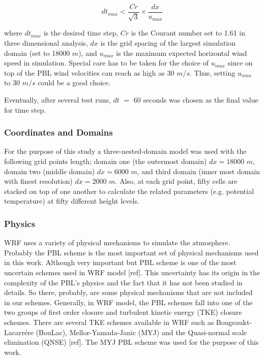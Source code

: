 \documentclass[a4paper,12pt]{article}
\numberwithin{equation}{section} %
\begin{document}
\vspace{0.25cm}
\begin{equation}
dt_{max} < \frac{Cr}{\sqrt{3}} \times \frac{dx}{u_{max}}
\end{equation}

where $dt_{max}$ is the desired time step, $Cr$ is the Courant number set to 1.61 in three dimensional analysis, $dx$ is the grid spacing of the largest simulation domain (set to 18000 $m$), and $u_{max}$ is the maximum expected horizontal wind speed in simulation. Special care has to be taken for the choice of $u_{max}$ since on top of the PBL wind velocities can reach as high as 30 $m/s$. Thus, setting $u_{max}$ to 30 $m/s$ could be a good choice.

\vspace{0.25cm}

Eventually, after several test runs, $dt$ $=$ $60$ seconds was chosen as the final value for time step.

\subsubsection{Coordinates and Domains}
For the purpose of this study a three-nested-domain model was used with the following grid points length; domain one (the outermost domain) $dx = 18000$ $m$, domain two (middle domain) $dx = 6000$ $m$, and third domain (inner most domain with finest resolution) $dx = 2000$ $m$. %
Also, at each grid point, fifty cells are stacked on top of one another to calculate the related parameters (e.g. potential temperature) at fifty different height levels.

\subsubsection{Physics}

WRF uses a variety of physical mechanisms to simulate the atmosphere. Probably the PBL scheme is the most important set of physical mechanisms used in this work. Although very important but PBL scheme is one of the most uncertain schemes used in WRF model [ref]. This uncertainty has its origin in the complexity of the PBL's physics and the fact that it has not been studied in details. So there, probably, are some physical mechanisms that are not included in our schemes.  Generally, in WRF model, the PBL schemes fall into one of the two groups of first order closure and turbulent kinetic energy (TKE) closure schemes. There are several TKE schemes available in WRF such as Bougeaukt-Lacarrére (BouLac), Mellor-Yamada-Janic (MYJ) and the Quasi-normal scale elimination (QNSE) [ref]. The MYJ PBL scheme was used for the purpose of this work.
\end{document}
